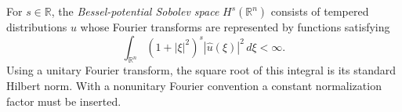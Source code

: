 
For $s\in\mathbb R$, the \emph{Bessel-potential Sobolev space} $H^s(\mathbb R^n)$ consists of tempered distributions $u$ whose Fourier transforms are represented by functions satisfying
\[
\int_{\mathbb R^n}(1+|\xi|^2)^s|\widehat u(\xi)|^2\,d\xi<\infty.
\]
Using a unitary Fourier transform, the square root of this integral is its standard Hilbert norm. With a nonunitary Fourier convention a constant normalization factor must be inserted.
